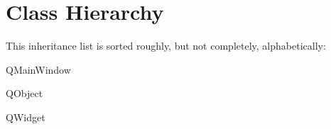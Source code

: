\section{Class Hierarchy}
This inheritance list is sorted roughly, but not completely, alphabetically\+:\begin{DoxyCompactList}
\item Q\+Main\+Window\begin{DoxyCompactList}
\item {}
\end{DoxyCompactList}
\item Q\+Object\begin{DoxyCompactList}
\item {}
\end{DoxyCompactList}
\item Q\+Widget\begin{DoxyCompactList}
\item {}
\end{DoxyCompactList}
\end{DoxyCompactList}
